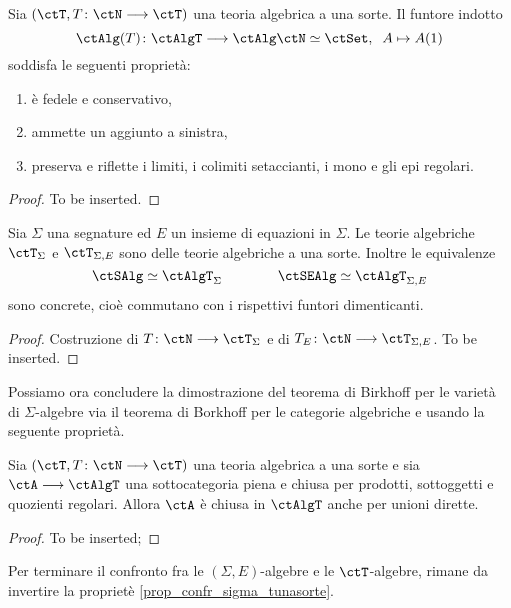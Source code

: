 \begin{proposition}\label{prop_funt_ind_unasorte}
Sia $(\ctT, T \colon \ctN \fun \ctT)$ una teoria algebrica a una sorte. Il funtore indotto
\[
  \ctAlg(T) \colon \ctAlgT \fun \ctAlg\ctN \simeq \ctSet , \;\; A \mapsto A(1) 
\]
soddisfa le seguenti proprietà:
\begin{enumerate}
\item è fedele e conservativo,
\item ammette un aggiunto a sinistra,
\item preserva e riflette i limiti, i colimiti setaccianti, i mono e gli epi regolari.
\end{enumerate}
\end{proposition}

\begin{proof}
To be inserted.
\end{proof}

\begin{proposition}\label{prop_confr_sigma_tunasorte}
Sia $\Sigma$ una segnature ed $E$ un insieme di equazioni in $\Sigma$. Le teorie algebriche $\ctT_{\Sigma}$ e $\ctT_{\Sigma,E}$
sono delle teorie algebriche a una sorte. Inoltre le equivalenze
\[
  \ctSAlg \simeq \ctAlgT_{\Sigma} \qquad\qquad \ctSEAlg \simeq \ctAlgT_{\Sigma,E} 
\]
sono concrete, cioè commutano con i rispettivi funtori dimenticanti.
\end{proposition} 

\begin{proof}
Costruzione di $T \colon \ctN \fun \ctT_{\Sigma}$ e di $T_E \colon \ctN \fun \ctT_{\Sigma,E}$. To be inserted.
\end{proof} 

Possiamo ora concludere la dimostrazione del teorema di Birkhoff per le varietà di $\Sigma$-algebre via il teorema di Borkhoff
per le categorie algebriche e usando la seguente proprietà.

\begin{proposition}\label{prop_rid_Birkhoff}
Sia $(\ctT, T \colon \ctN \fun \ctT)$ una teoria algebrica a una sorte e sia $\ctA \fun \ctAlgT$ una sottocategoria piena e chiusa
per prodotti, sottoggetti e quozienti regolari. Allora $\ctA$ è chiusa in $\ctAlgT$ anche per unioni dirette.
\end{proposition}

\begin{proof}
To be inserted;
\end{proof} 

Per terminare il confronto fra le $(\Sigma,E)$-algebre e le $\ctT$-algebre, rimane da invertire la proprietè \ref{prop_confr_sigma_tunasorte}.

